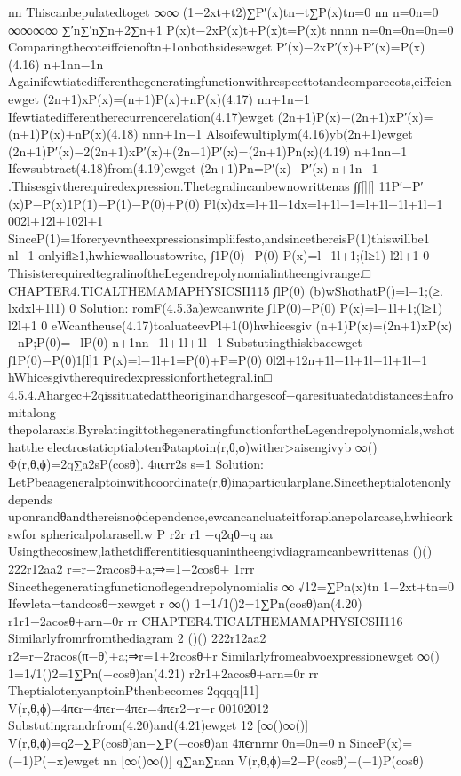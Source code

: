 {{{{{{nn
Thiscanbepulatedtoget
∞∞
(1−2xt+t2)∑P′(x)tn−t∑P(x)tn=0
nn
n=0n=0
∞∞∞∞
∑′n∑′n∑n+2∑n+1
P(x)t−2xP(x)t+P(x)t=P(x)t
nnnn
n=0n=0n=0n=0
Comparingthecoteiffcienoftn+1onbothsidesewget
P′(x)−2xP′(x)+P′(x)=P(x)(4.16)
n+1nn−1n
Againifewtiatedifferenthegeneratingfunctionwithrespecttotandcomparecots,eiffcienewget
(2n+1)xP(x)=(n+1)P(x)+nP(x)(4.17)
nn+1n−1
Ifewtiatedifferentherecurrencerelation(4.17)ewget
(2n+1)P(x)+(2n+1)xP′(x)=(n+1)P(x)+nP(x)(4.18)
nnn+1n−1
Alsoifewultiplym(4.16)yb(2n+1)ewget
(2n+1)P′(x)−2(2n+1)xP′(x)+(2n+1)P′(x)=(2n+1)Pn(x)(4.19)
n+1nn−1
Ifewsubtract(4.18)from(4.19)ewget
(2n+1)Pn=P′(x)−P′(x)
n+1n−1
.Thisesgivtherequiredexpression.Thetegralincanbewnowrittenas
∫∫[][]
11P′−P′(x)P−P(x)1P(1)−P(1)−P(0)+P(0)
Pl(x)dx=l+1l−1dx=l+1l−1=l+1l−1l+1l−1
002l+12l+102l+1
SinceP(1)=1foreryevntheexpressionsimpliifesto,andsincethereisP(1)thiswillbe1
nl−1
onlyifl≥1,hwhicwsalloustowrite,
∫1P(0)−P(0)
P(x)=l−1l+1;(l≥1)
l2l+1
0
ThisisterequiredtegralinoftheLegendrepolynomialintheengivrange.□
CHAPTER4.TICALTHEMAMAPHYSICSII115
∫lP(0)
(b)wShothatP()=l−1;(≥.
lxdxl+1l1)
0
Solution:
romF(4.5.3a)ewcanwrite
∫1P(0)−P(0)
P(x)=l−1l+1;(l≥1)
l2l+1
0
eWcantheuse(4.17)toaluateevPl+1(0)hwhicesgiv
(n+1)P(x)=(2n+1)xP(x)−nP;P(0)=−lP(0)
n+1nn−1l+1l+1l−1
Substutingthiskbacewget
∫1P(0)−P(0)1[l]1
P(x)=l−1l+1=P(0)+P=P(0)
0l2l+12n+1l−1l+1l−1l+1l−1
hWhicesgivtherequiredexpressionforthetegral.in□
4.5.4.Ahargec+2qissituatedattheoriginandhargescof−qaresituatedatdistances±afromitalong
thepolaraxis.ByrelatingittothegeneratingfunctionfortheLegendrepolynomials,wshothatthe
electrostaticptialotenΦataptoin(r,θ,ϕ)wither>aisengivyb
∞()
Φ(r,θ,ϕ)=2q∑a2sP(cosθ).
4πϵrr2s
s=1
Solution:
LetPbeaageneralptoinwithcoordinate(r,θ)inaparticularplane.Sincetheptialotenonlydepends
uponrandθandthereisnoϕdependence,ewcancancluateitforaplanepolarcase,hwhicorkswfor
sphericalpolarasell.w
P
r2r
r1
−q2qθ−q
aa
Usingthecosinew,lathetdifferentitiesquanintheengivdiagramcanbewrittenas
()()
222r12aa2
r=r−2racosθ+a;⇒=1−2cosθ+
1rrr
Sincethegeneratingfunctionoflegendrepolynomialis
∞
√12=∑Pn(x)tn
1−2xt+tn=0
Ifewleta=tandcosθ=xewget
r
∞()
1=1√1()2=1∑Pn(cosθ)an(4.20)
r1r1−2acosθ+arn=0r
rr
CHAPTER4.TICALTHEMAMAPHYSICSII116
Similarlyfromrfromthediagram
2
()()
222r12aa2
r2=r−2racos(π−θ)+a;⇒r=1+2rcosθ+r
Similarlyfromeabvoexpressionewget
∞()
1=1√1()2=1∑Pn(−cosθ)an(4.21)
r2r1+2acosθ+arn=0r
rr
TheptialotenyanptoinPthenbecomes
2qqqq[11]
V(r,θ,ϕ)=4πϵr−4πϵr−4πϵr=4πϵr2−r−r
00102012
Substutingrandrfrom(4.20)and(4.21)ewget
12
[∞()∞()]
V(r,θ,ϕ)=q2−∑P(cosθ)an−∑P(−cosθ)an
4πϵrnrnr
0n=0n=0
n
SinceP(x)=(−1)P(−x)ewget
nn
[∞()∞()]
q∑an∑nan
V(r,θ,ϕ)=2−P(cosθ)−(−1)P(cosθ)
}}}}}}
